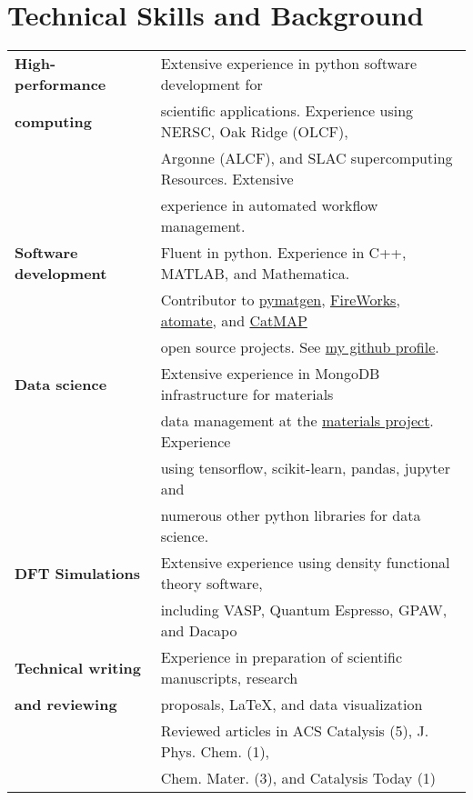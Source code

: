 \documentclass[a4paper,10pt]{article}
\begin{document}
\section{Technical Skills and Background}
\begin{tabular}{ll}
 \textbf{High-performance} & Extensive experience in python software development for \\ 
 \textbf{computing}  & scientific applications.  Experience using NERSC, Oak Ridge (OLCF), \\
 & Argonne (ALCF), and SLAC supercomputing Resources.  Extensive  \\
 &experience in automated workflow management.\vspace{0.13in} \\

 \textbf{Software development} & Fluent in python.  Experience in C++, MATLAB, and Mathematica. \vspace{0.05in} \\
 & Contributor to \href{pymatgen.org}{pymatgen}, \href{https://materialsproject.github.io/fireworks/}{FireWorks}, \href{https://hackingmaterials.github.io/atomate}{atomate}, and \href{http://catmap.readthedocs.io/en/latest/}{CatMAP}\\
 & open source projects. See \href{https://github.com/montoyjh}{my github profile}.  \vspace{0.13in}\\


 \textbf{Data science} & Extensive experience in MongoDB infrastructure for materials \\
 & data management at the \href{http://materialsproject.org}{materials project}.  Experience \\
 & using tensorflow, scikit-learn, pandas, jupyter and \\
 & numerous other python libraries for data science.\vspace{0.13in}\\
 \textbf{DFT Simulations} & Extensive experience using density functional theory software, \\
 & including VASP, Quantum Espresso, GPAW, and Dacapo \vspace{0.13in}\\
 \textbf{Technical writing} & Experience in preparation of scientific manuscripts, research \\
 \textbf{and reviewing} & proposals, \LaTeX, and data visualization \vspace{0.05in}\\
& Reviewed articles in ACS Catalysis (5), J. Phys. Chem. (1), \\
& Chem. Mater. (3), and Catalysis Today (1)
 \end{tabular}
\end{document}
